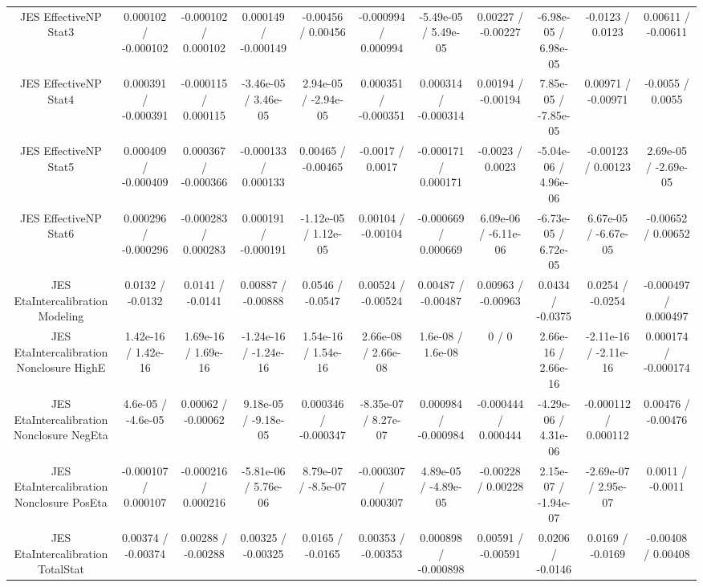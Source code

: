 \begin{table}[htbp]
\begin{center}
\begin{tabular}{|c|c|c|c|c|c|c|c|c|c|c|}
  JES EffectiveNP Stat3 & 0.000102 / -0.000102 & -0.000102 / 0.000102 & 0.000149 / -0.000149 & -0.00456 / 0.00456 & -0.000994 / 0.000994 & -5.49e-05 / 5.49e-05 & 0.00227 / -0.00227 & -6.98e-05 / 6.98e-05 & -0.0123 / 0.0123 & 0.00611 / -0.00611 \\ 
  JES EffectiveNP Stat4 & 0.000391 / -0.000391 & -0.000115 / 0.000115 & -3.46e-05 / 3.46e-05 & 2.94e-05 / -2.94e-05 & 0.000351 / -0.000351 & 0.000314 / -0.000314 & 0.00194 / -0.00194 & 7.85e-05 / -7.85e-05 & 0.00971 / -0.00971 & -0.0055 / 0.0055 \\ 
  JES EffectiveNP Stat5 & 0.000409 / -0.000409 & 0.000367 / -0.000366 & -0.000133 / 0.000133 & 0.00465 / -0.00465 & -0.0017 / 0.0017 & -0.000171 / 0.000171 & -0.0023 / 0.0023 & -5.04e-06 / 4.96e-06 & -0.00123 / 0.00123 & 2.69e-05 / -2.69e-05 \\ 
  JES EffectiveNP Stat6 & 0.000296 / -0.000296 & -0.000283 / 0.000283 & 0.000191 / -0.000191 & -1.12e-05 / 1.12e-05 & 0.00104 / -0.00104 & -0.000669 / 0.000669 & 6.09e-06 / -6.11e-06 & -6.73e-05 / 6.72e-05 & 6.67e-05 / -6.67e-05 & -0.00652 / 0.00652 \\ 
  JES EtaIntercalibration Modeling & 0.0132 / -0.0132 & 0.0141 / -0.0141 & 0.00887 / -0.00888 & 0.0546 / -0.0547 & 0.00524 / -0.00524 & 0.00487 / -0.00487 & 0.00963 / -0.00963 & 0.0434 / -0.0375 & 0.0254 / -0.0254 & -0.000497 / 0.000497 \\ 
  JES EtaIntercalibration Nonclosure HighE & 1.42e-16 / 1.42e-16 & 1.69e-16 / 1.69e-16 & -1.24e-16 / -1.24e-16 & 1.54e-16 / 1.54e-16 & 2.66e-08 / 2.66e-08 & 1.6e-08 / 1.6e-08 & 0 / 0 & 2.66e-16 / 2.66e-16 & -2.11e-16 / -2.11e-16 & 0.000174 / -0.000174 \\ 
  JES EtaIntercalibration Nonclosure NegEta & 4.6e-05 / -4.6e-05 & 0.00062 / -0.00062 & 9.18e-05 / -9.18e-05 & 0.000346 / -0.000347 & -8.35e-07 / 8.27e-07 & 0.000984 / -0.000984 & -0.000444 / 0.000444 & -4.29e-06 / 4.31e-06 & -0.000112 / 0.000112 & 0.00476 / -0.00476 \\ 
  JES EtaIntercalibration Nonclosure PosEta & -0.000107 / 0.000107 & -0.000216 / 0.000216 & -5.81e-06 / 5.76e-06 & 8.79e-07 / -8.5e-07 & -0.000307 / 0.000307 & 4.89e-05 / -4.89e-05 & -0.00228 / 0.00228 & 2.15e-07 / -1.94e-07 & -2.69e-07 / 2.95e-07 & 0.0011 / -0.0011 \\ 
  JES EtaIntercalibration TotalStat & 0.00374 / -0.00374 & 0.00288 / -0.00288 & 0.00325 / -0.00325 & 0.0165 / -0.0165 & 0.00353 / -0.00353 & 0.000898 / -0.000898 & 0.00591 / -0.00591 & 0.0206 / -0.0146 & 0.0169 / -0.0169 & -0.00408 / 0.00408 \\ 

\end{tabular}
\end{center}
\end{table}
